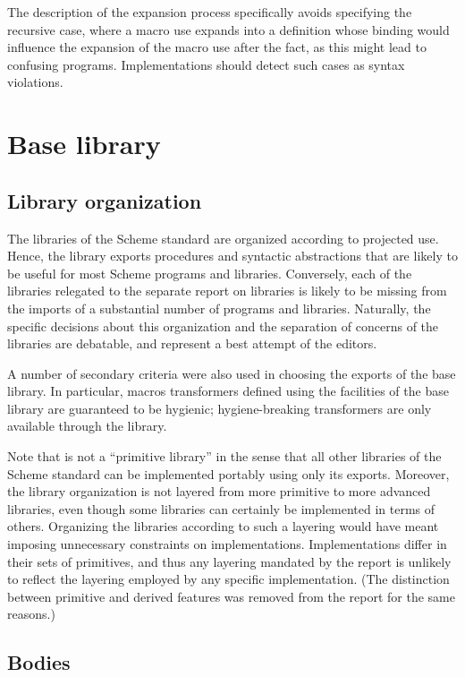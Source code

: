 \documentclass[twoside,twocolumn]{algol60}
\begin{document}
The description of the expansion process specifically avoids
specifying the recursive case, where a macro use expands into a
definition whose binding would influence the expansion of the macro
use after the fact, as this might lead to confusing programs.
Implementations should detect such cases as syntax violations.

\chapter{Base library}

\section{Library organization}

The libraries of the Scheme standard are organized according to
projected use.  Hence, the  library exports
procedures and syntactic abstractions that are likely to be useful for
most Scheme programs and libraries.  Conversely, each of the libraries
relegated to the separate report on libraries is likely to be missing
from the imports of a substantial number of programs and libraries.
Naturally, the specific decisions about this organization and the
separation of concerns of the libraries are debatable, and represent a
best attempt of the editors.

A number of secondary criteria were also used in choosing the exports
of the base library.  In particular, macros transformers defined using
the facilities of the base library are guaranteed to be hygienic;
hygiene-breaking transformers are only available through the
 library.

Note that  is not a ``primitive library'' in the
sense that all other libraries of the Scheme standard can be
implemented portably using only its exports.  Moreover, the library
organization is not layered from more primitive to more advanced
libraries, even though some libraries can certainly be implemented in
terms of others.  Organizing the libraries according to such a
layering would have meant imposing unnecessary constraints on
implementations.  Implementations differ in their sets of primitives,
and thus any layering mandated by the report is unlikely to reflect
the layering employed by any specific implementation.  (The
distinction between primitive and derived features was removed from
the report for the same reasons.)

\section{Bodies}
\end{document}
